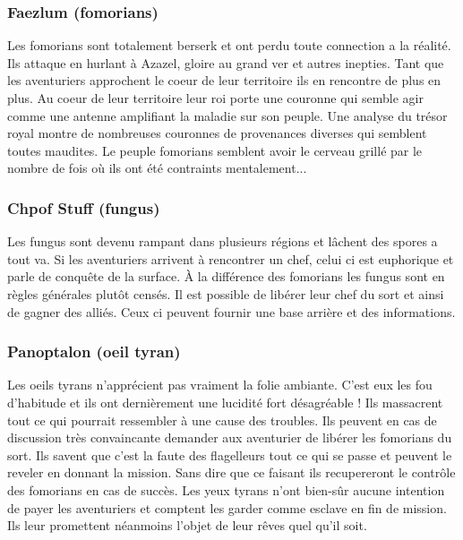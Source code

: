 \subsubsection*{Faezlum (fomorians)}

Les fomorians sont totalement berserk et ont perdu toute connection a la réalité. Ils 
attaque en hurlant à Azazel, gloire au grand ver et autres inepties. Tant que les 
aventuriers approchent le coeur de leur territoire ils en rencontre de plus en plus. 
Au coeur de leur territoire leur roi porte une couronne qui semble agir comme une 
antenne amplifiant la maladie sur son peuple. Une analyse du trésor royal montre de 
nombreuses couronnes de provenances diverses qui semblent toutes maudites. Le peuple 
fomorians semblent avoir le cerveau grillé par le nombre de fois où ils ont été 
contraints mentalement...

\subsubsection*{Chpof Stuff (fungus)}

Les fungus sont devenu rampant dans plusieurs régions et lâchent des spores a tout 
va. Si les aventuriers arrivent à rencontrer un chef, celui ci est euphorique et 
parle de conquête de la surface. À la différence des fomorians les fungus sont en 
règles générales plutôt censés. Il est possible de libérer leur chef du sort et 
ainsi de gagner des alliés. Ceux ci peuvent fournir une base arrière et des informations.

\subsubsection*{Panoptalon (oeil tyran)}

Les oeils tyrans n'apprécient pas vraiment la folie ambiante. C'est eux les fou 
d'habitude et ils ont dernièrement une lucidité fort désagréable ! Ils massacrent 
tout ce qui pourrait ressembler à une cause des troubles. Ils peuvent en cas de 
discussion très convaincante demander aux aventurier de libérer les fomorians du 
sort. Ils savent que c'est la faute des flagelleurs tout ce qui se passe et peuvent 
le reveler en donnant la mission. Sans dire que ce faisant ils recupereront le 
contrôle des fomorians en cas de succès. Les yeux tyrans n'ont bien-sûr aucune 
intention de payer les aventuriers et comptent les garder comme esclave en fin 
de mission. Ils leur promettent néanmoins l'objet de leur rêves quel qu'il soit.

